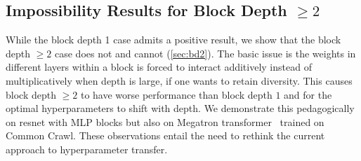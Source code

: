 \subsection{Impossibility Results for Block Depth $\ge 2$}

While the block depth 1 case admits a positive result, we show that the block depth $\ge 2$ case does not and cannot (\cref{sec:bd2}). The basic issue is the weights in different layers within a block is forced to interact additively instead of multiplicatively when depth is large, if one wants to retain diversity.
This causes block depth $\ge 2$ to have worse performance than block depth $1$ and for the optimal hyperparameters to shift with depth.
We demonstrate this pedagogically on resnet with MLP blocks but also on Megatron transformer~\citep{shoeybi2019megatron} trained on Common Crawl.
These observations entail the need to rethink the current approach to hyperparameter transfer.

